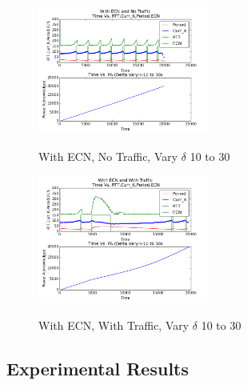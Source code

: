 \begin{figure}[htb]
  \begin{center}

    \includegraphics[width=0.50\textwidth]{Figures/iccps2014/w_ecn_no_tr_d10_30.png}
  \caption{With ECN, No Traffic, Vary $\delta$ 10 to 30}
  \label{fig:w_ecn_no_tr_d10_30}
    \includegraphics[width=0.50\textwidth]{Figures/iccps2014/w_ecn_w_tr_d10_30.png}
  \caption{With ECN, With Traffic, Vary $\delta$ 10 to 30}
  \label{fig:w_ecn_w_tr_d10_30}

  \end{center}
\end{figure}

\subsection{Experimental Results}
\label{sec:exp_results}

